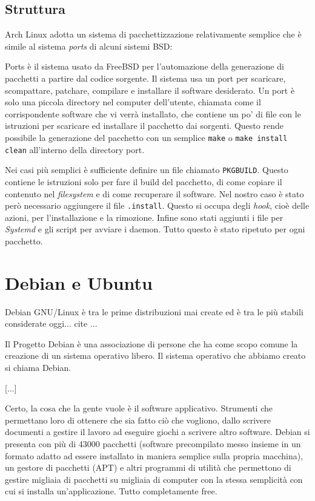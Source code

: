 \documentclass[10pt,titlepage,twoside,a4paper]{report}
\begin{document}
\subsection{Struttura}
Arch Linux adotta un sistema di pacchettizzazione relativamente semplice 
che è simile al sistema \emph{ports} di alcuni sistemi 
BSD\cite{portsLikeSystem}:
\begin{displayquote}
Ports è il sistema usato da FreeBSD per l'automazione della generazione di 
pacchetti a partire dal codice sorgente. Il sistema usa un port per scaricare, 
scompattare, patchare, compilare e installare il software desiderato. Un port 
è solo una piccola directory nel computer dell'utente, chiamata come il 
corrispondente software che vi verrà installato, che contiene un po' di file 
con le istruzioni per scaricare ed installare il pacchetto dai sorgenti. Questo 
rende possibile la generazione del pacchetto con un semplice \texttt{make} o 
\texttt{make install clean} all'interno della directory port.
\end{displayquote}

Nei casi più semplici è sufficiente definire un file chiamato 
\texttt{PKGBUILD}. Questo contiene le istruzioni solo per fare il build del 
pacchetto, di come copiare il contenuto nel \emph{filesystem} e di come 
recuperare il software. Nel nostro caso è stato però necessario aggiungere
il file \texttt{.install}. Questo si occupa degli \emph{hook}, cioè delle 
azioni, per l'installazione e la rimozione. Infine sono stati aggiunti i file 
per \emph{Systemd} e gli script per avviare i daemon. Tutto questo è stato 
ripetuto per ogni pacchetto.


\section{Debian e Ubuntu}
Debian GNU/Linux è tra le prime distribuzioni mai 
create\cite{debianFirstDistro} ed 
è tra le più stabili considerate oggi... cite ...
 
\cite{debian}
\begin{displayquote}
Il Progetto Debian è una associazione di persone che ha come scopo comune la 
creazione di un sistema operativo libero. Il sistema operativo che abbiamo 
creato si chiama Debian.

[...]

Certo, la cosa che la gente vuole è il software applicativo. Strumenti che 
permettano loro di ottenere che sia fatto ciò che vogliono, dallo scrivere 
documenti a gestire il lavoro ad eseguire giochi a scrivere altro software. 
Debian si presenta con più di 43000 pacchetti (software precompilato messo 
insieme in un formato adatto ad essere installato in maniera semplice sulla 
propria macchina), un gestore di pacchetti (APT) e altri programmi di utilità 
che permettono di gestire migliaia di pacchetti su migliaia di computer con la 
stessa semplicità con cui si installa un'applicazione. Tutto completamente 
free. 
\end{displayquote}
\end{document}
